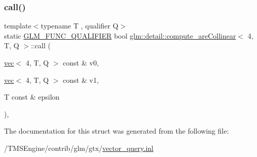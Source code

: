 \subsubsection{\texorpdfstring{call()}{call()}}
{\footnotesize\ttfamily template$<$typename T , qualifier Q$>$ \\
static \hyperlink{setup_8hpp_a33fdea6f91c5f834105f7415e2a64407}{G\+L\+M\+\_\+\+F\+U\+N\+C\+\_\+\+Q\+U\+A\+L\+I\+F\+I\+ER} bool \hyperlink{structglm_1_1detail_1_1compute__are_collinear}{glm\+::detail\+::compute\+\_\+are\+Collinear}$<$ 4, T, Q $>$\+::call (\begin{DoxyParamCaption}\item[{\hyperlink{structglm_1_1vec}{vec}$<$ 4, T, Q $>$ const \&}]{v0,  }\item[{\hyperlink{structglm_1_1vec}{vec}$<$ 4, T, Q $>$ const \&}]{v1,  }\item[{T const \&}]{epsilon }\end{DoxyParamCaption})\hspace{0.3cm}{\ttfamily [inline]}, {\ttfamily [static]}}



The documentation for this struct was generated from the following file\+:\begin{DoxyCompactItemize}
\item 
/\+T\+M\+S\+Engine/contrib/glm/gtx/\hyperlink{vector__query_8inl}{vector\+\_\+query.\+inl}\end{DoxyCompactItemize}
